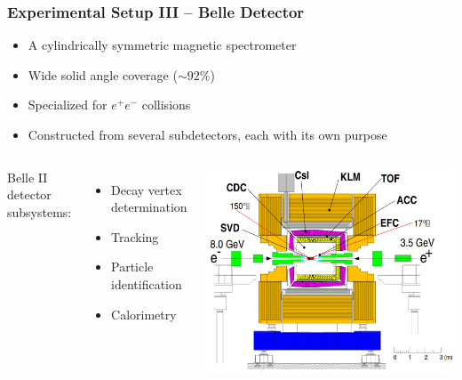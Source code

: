 \documentclass[serif]{beamer}
\begin{document}
\begin{frame}[t]
\frametitle{Experimental Setup III -- Belle Detector}
\vspace{-3mm}
\small

\begin{block}{}
\begin{itemize}
\item A cylindrically symmetric magnetic spectrometer
\item Wide solid angle coverage ($\sim92\%$)
\item Specialized for $e^+e^-$ collisions
\item Constructed from several subdetectors, each with its own purpose
\end{itemize}
\end{block}

\begin{columns}
Belle II detector subsystems:
\begin{itemize}
\item Decay vertex determination
\item Tracking
\item Particle identification
\item Calorimetry
\end{itemize}

\includegraphics[scale=0.16]{fig/setup/Belle_detector}
\end{columns}

\end{frame}
\end{document}
